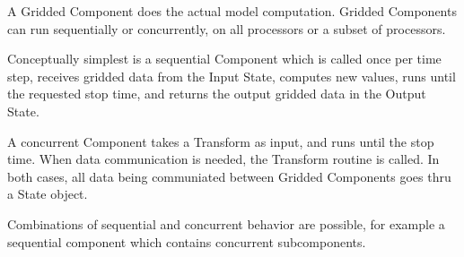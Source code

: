 %


A Gridded Component does the actual model computation.
Gridded Components can run sequentially or concurrently, on all
processors or a subset of processors. 

Conceptually simplest is a sequential Component which is called
once per time step, receives 
gridded data from the Input State, computes new values, runs
until the requested stop time, and returns the output 
gridded data in the Output State.  

A concurrent Component takes a Transform as input, and runs
until the stop time.  When data communication is needed, the
Transform routine is called.  In both cases, all data being
communiated between Gridded Components goes thru a State object.

Combinations of sequential and concurrent behavior are possible,
for example a sequential component which contains concurrent
subcomponents.

